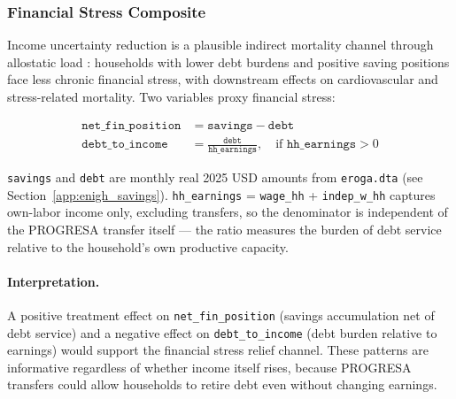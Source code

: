 \subsubsection{Financial Stress Composite}
\label{app:enigh_fin_stress}

Income uncertainty reduction is a plausible indirect mortality channel
through allostatic load \citep{aizer2016}: households with lower debt burdens
and positive saving positions face less chronic financial stress, with downstream
effects on cardiovascular and stress-related mortality. Two variables proxy
financial stress:

\begin{align}
\texttt{net\_fin\_position} &= \texttt{savings} - \texttt{debt}
    \label{eq:net_fin} \\[4pt]
\texttt{debt\_to\_income}   &= \frac{\texttt{debt}}{\texttt{hh\_earnings}},
    \quad \text{if } \texttt{hh\_earnings} > 0
    \label{eq:debt_income}
\end{align}

\noindent
\texttt{savings} and \texttt{debt} are monthly real 2025 USD amounts from
\texttt{eroga.dta} (see Section~\ref{app:enigh_savings}).
\texttt{hh\_earnings} = \texttt{wage\_hh} + \texttt{indep\_w\_hh} captures
own-labor income only, excluding transfers, so the denominator is independent
of the PROGRESA transfer itself — the ratio measures the burden of debt service
relative to the household's own productive capacity.

\paragraph{Interpretation.}
A positive treatment effect on \texttt{net\_fin\_position} (savings
accumulation net of debt service) and a negative effect on
\texttt{debt\_to\_income} (debt burden relative to earnings) would support
the financial stress relief channel. These patterns are informative regardless
of whether income itself rises, because PROGRESA transfers could allow
households to retire debt even without changing earnings.


